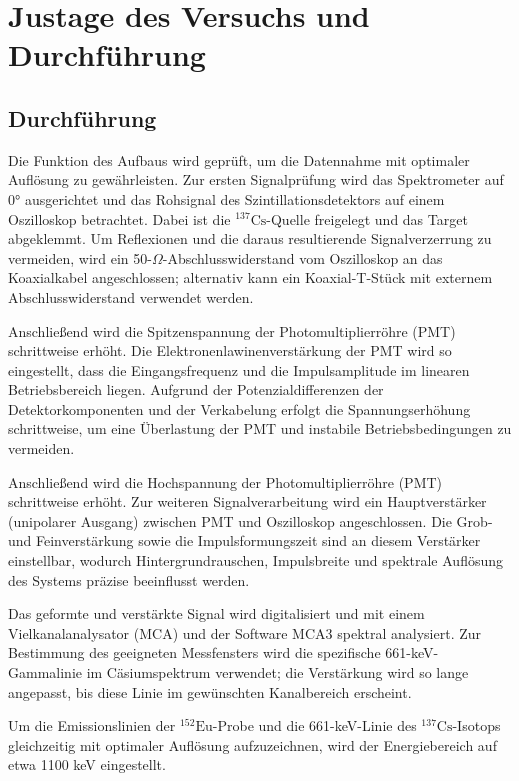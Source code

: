 \section{Justage des Versuchs und Durchführung}
\subsection{Durchführung}
Die Funktion des Aufbaus wird geprüft, um die Datennahme mit optimaler Auflösung zu gewährleisten. 
Zur ersten Signalprüfung wird das Spektrometer auf 0° ausgerichtet und das Rohsignal des Szintillationsdetektors auf einem Oszilloskop betrachtet. Dabei ist die $^{137}\text{Cs}$-Quelle freigelegt und das Target abgeklemmt. Um Reflexionen und die daraus resultierende Signalverzerrung zu vermeiden, wird ein 50-$\Omega$-Abschlusswiderstand vom Oszilloskop an das Koaxialkabel angeschlossen; alternativ kann ein Koaxial-T-Stück mit externem Abschlusswiderstand verwendet werden.

Anschließend wird die Spitzenspannung der Photomultiplierröhre (PMT) schrittweise erhöht. Die Elektronenlawinenverstärkung der PMT wird so eingestellt, dass die Eingangsfrequenz und die Impulsamplitude im linearen Betriebsbereich liegen. Aufgrund der Potenzialdifferenzen der Detektorkomponenten und der Verkabelung erfolgt die Spannungserhöhung schrittweise, um eine Überlastung der PMT und instabile Betriebsbedingungen zu vermeiden.

Anschließend wird die Hochspannung der Photomultiplierröhre (PMT) schrittweise erhöht. Zur weiteren Signalverarbeitung wird ein Hauptverstärker (unipolarer Ausgang) zwischen PMT und Oszilloskop angeschlossen. Die Grob- und Feinverstärkung sowie die Impulsformungszeit sind an diesem Verstärker einstellbar, wodurch Hintergrundrauschen, Impulsbreite und spektrale Auflösung des Systems präzise beeinflusst werden.

Das geformte und verstärkte Signal wird digitalisiert und mit einem Vielkanalanalysator (MCA) und der Software MCA3 spektral analysiert. Zur Bestimmung des geeigneten Messfensters wird die spezifische 661-keV-Gammalinie im Cäsiumspektrum verwendet; die Verstärkung wird so lange angepasst, bis diese Linie im gewünschten Kanalbereich erscheint.

Um die Emissionslinien der $^{152}\text{Eu}$-Probe und die 661-keV-Linie des $^{137}\text{Cs}$-Isotops gleichzeitig mit optimaler Auflösung aufzuzeichnen, wird der Energiebereich auf etwa 1100 keV eingestellt.

